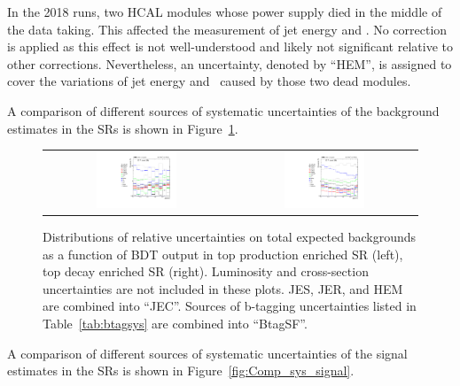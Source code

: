 In the 2018 runs, two HCAL modules whose power supply died in the middle of the data taking. This affected the measurement of jet energy and \MET. No correction is applied as this effect is not well-understood and likely not significant relative to other corrections. Nevertheless, an uncertainty, denoted by ``HEM'', is assigned to cover the variations of jet energy and \MET~caused by those two dead modules. 

A comparison of different sources of systematic uncertainties of the background estimates in the \acp{SR} is shown in Figure~\ref{fig:Comp_sys_background}.

\begin{figure}[tbh!]
 \begin{center}
 \begin{tabular}{cc}
 \includegraphics[width=0.45\textwidth]{figures/Part3/Systematics/sysBDT_ST_bkg_2017}&
 \includegraphics[width=0.45\textwidth]{figures/Part3/Systematics/sysBDT_TT_bkg_2017} \\
 \end{tabular}
 \caption{Distributions of relative uncertainties on total expected backgrounds as a function of \ac{BDT} output in top production enriched \ac{SR} (left), top decay enriched \ac{SR} (right). Luminosity and cross-section uncertainties are not included in these plots. \ac{JES}, \ac{JER}, and HEM are combined into ``JEC''. Sources of b-tagging uncertainties listed in Table~\ref{tab:btagsys} are combined into ``BtagSF''.}
 \label{fig:Comp_sys_background}
 \end{center}
\end{figure}

A comparison of different sources of systematic uncertainties of the signal estimates in the \acp{SR} is shown in Figure~\ref{fig:Comp_sys_signal}.


